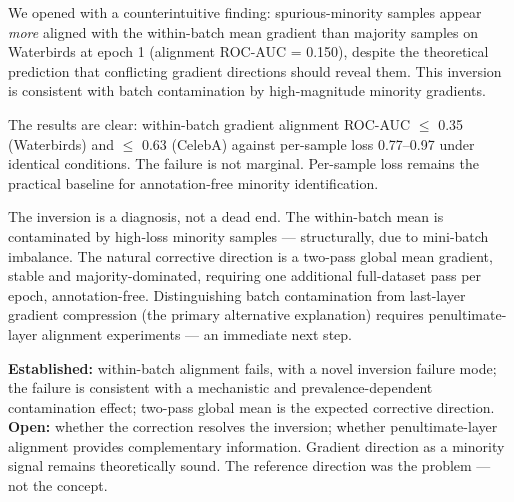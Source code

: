 
We opened with a counterintuitive finding: spurious-minority samples appear \textit{more} aligned with the within-batch mean gradient than majority samples on Waterbirds at epoch 1 (alignment ROC-AUC = 0.150), despite the theoretical prediction that conflicting gradient directions should reveal them. This inversion is consistent with batch contamination by high-magnitude minority gradients.

The results are clear: within-batch gradient alignment ROC-AUC $\leq$ 0.35 (Waterbirds) and $\leq$ 0.63 (CelebA) against per-sample loss 0.77--0.97 under identical conditions. The failure is not marginal. Per-sample loss remains the practical baseline for annotation-free minority identification.

The inversion is a diagnosis, not a dead end. The within-batch mean is contaminated by high-loss minority samples --- structurally, due to mini-batch imbalance. The natural corrective direction is a two-pass global mean gradient, stable and majority-dominated, requiring one additional full-dataset pass per epoch, annotation-free. Distinguishing batch contamination from last-layer gradient compression (the primary alternative explanation) requires penultimate-layer alignment experiments --- an immediate next step.

\textbf{Established:} within-batch alignment fails, with a novel inversion failure mode; the failure is consistent with a mechanistic and prevalence-dependent contamination effect; two-pass global mean is the expected corrective direction. \textbf{Open:} whether the correction resolves the inversion; whether penultimate-layer alignment provides complementary information. Gradient direction as a minority signal remains theoretically sound. The reference direction was the problem --- not the concept.

